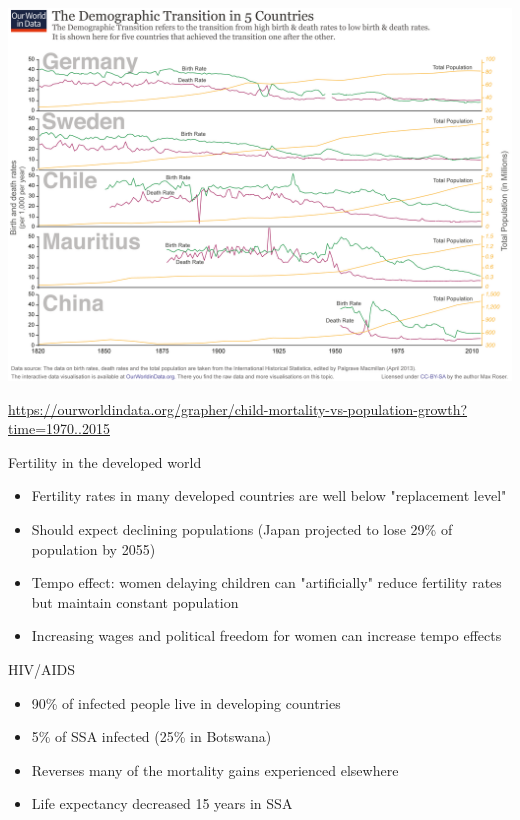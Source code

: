 \documentclass[10pt]{beamer}
\begin{document}
\begin{frame}[label={sec:org3c9ac42}]{}
\begin{center}
\includegraphics[width=.75\textwidth]{./img/demographic-transition-5.png}
\end{center}
\end{frame}

\begin{frame}[label={sec:org2d49e98}]{}
\url{https://ourworldindata.org/grapher/child-mortality-vs-population-growth?time=1970..2015}
\end{frame}

\begin{frame}[label={sec:org556a4bc}]{}
\alert{Fertility in the developed world}
\begin{itemize}
\item Fertility rates in many developed countries are well below "replacement level"
\item Should expect declining populations (Japan projected to lose 29\% of population by 2055)
\item Tempo effect: women delaying children can "artificially" reduce fertility rates but maintain constant population
\item Increasing wages and political freedom for women can increase tempo effects
\end{itemize}
\end{frame}

\begin{frame}[label={sec:orgf59b13f}]{}
\alert{HIV/AIDS}
\begin{itemize}
\item 90\% of infected people live in developing countries
\item 5\% of SSA infected (25\% in Botswana)
\item Reverses many of the mortality gains experienced elsewhere
\item Life expectancy \alert{decreased} 15 years in SSA
\end{itemize}
\end{frame}
\end{document}
